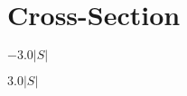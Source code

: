 \documentclass[12pt]{article}
\begin{document}
\section{Cross-Section}

$- 3.0 \lvert{S}\rvert$

$3.0 \lvert{S}\rvert$
\end{document}
